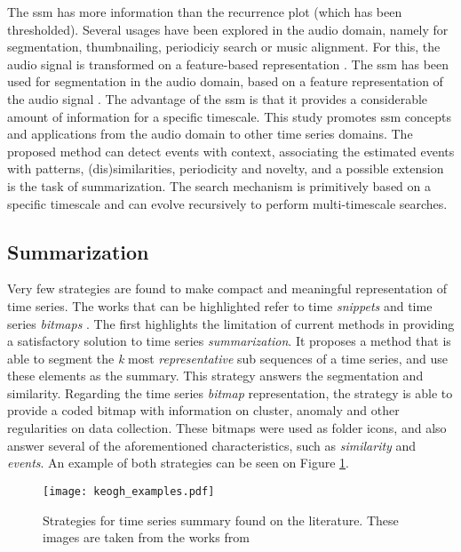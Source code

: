 The \gls{ssm} has more information than the recurrence plot (which has been thresholded). Several usages have been explored in the audio domain, namely for segmentation, thumbnailing, periodiciy search or music alignment. For this, the audio signal is transformed on a feature-based representation \cite{fmp1, fmp2}. 
The \gls{ssm} has been used for segmentation in the audio domain, based on a feature representation of the audio signal \cite{fmp1, fmp2}. The advantage of the \gls{ssm} is that it provides a considerable amount of information for a specific timescale. This study promotes \gls{ssm} concepts and applications from the audio domain to other time series domains. The proposed method can detect events with context, associating the estimated events with patterns, (dis)similarities, periodicity and novelty, and a possible extension is the task of summarization. The search mechanism is primitively based on a specific timescale and can evolve recursively to perform multi-timescale searches.

\subsection{Summarization}
\label{sec:literature_summarize}

Very few strategies are found to make compact and meaningful representation of time series. The works that can be highlighted refer to time \textit{snippets} and time series \textit{bitmaps} \cite{snippets, bitmap}. The first highlights the limitation of current methods in providing a satisfactory solution to time series \textit{summarization}. It proposes a method that is able to segment the \textit{k} most \textit{representative} sub sequences of a time series, and use these elements as the summary. This strategy answers the segmentation and similarity. Regarding the time series \textit{bitmap} representation, the strategy is able to provide a coded bitmap with information on cluster, anomaly and other regularities on data collection. These bitmaps were used as folder icons, and also answer several of the aforementioned characteristics, such as \textit{similarity} and \textit{events}. An example of both strategies can be seen on Figure \ref{fig:keogh_strat}.

\begin{figure}[t]
    \centering
    \texttt{[image: keogh\_examples.pdf]}
    \caption{Strategies for time series summary found on the literature. These images are taken from the works from \cite{snippets, bitmap}}
    \label{fig:keogh_strat}
\end{figure}

